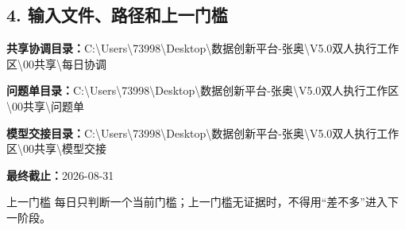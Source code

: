 \documentclass[UTF8,openany,zihao=-4]{ctexbook}
\renewcommand{\_}{\textunderscore\allowbreak}
\begin{document}
\subsection*{4. 输入文件、路径和上一门槛}
\noindent\textbf{共享协调目录：}{\promptlatin\promptcjk\small C:\textbackslash{}\allowbreak{}Users\textbackslash{}\allowbreak{}73998\textbackslash{}\allowbreak{}Desktop\textbackslash{}\allowbreak{}数据创新平台-\allowbreak{}张奥\textbackslash{}\allowbreak{}V5.0\_\allowbreak{}双人执行工作区\textbackslash{}\allowbreak{}00\_\allowbreak{}共享\textbackslash{}\allowbreak{}每日协调}\par
\noindent\textbf{问题单目录：}{\promptlatin\promptcjk\small C:\textbackslash{}\allowbreak{}Users\textbackslash{}\allowbreak{}73998\textbackslash{}\allowbreak{}Desktop\textbackslash{}\allowbreak{}数据创新平台-\allowbreak{}张奥\textbackslash{}\allowbreak{}V5.0\_\allowbreak{}双人执行工作区\textbackslash{}\allowbreak{}00\_\allowbreak{}共享\textbackslash{}\allowbreak{}问题单}\par
\noindent\textbf{模型交接目录：}{\promptlatin\promptcjk\small C:\textbackslash{}\allowbreak{}Users\textbackslash{}\allowbreak{}73998\textbackslash{}\allowbreak{}Desktop\textbackslash{}\allowbreak{}数据创新平台-\allowbreak{}张奥\textbackslash{}\allowbreak{}V5.0\_\allowbreak{}双人执行工作区\textbackslash{}\allowbreak{}00\_\allowbreak{}共享\textbackslash{}\allowbreak{}模型交接}\par
\noindent\textbf{最终截止：}{\promptlatin\promptcjk\small 2026-\allowbreak{}08-\allowbreak{}31}\par
\begin{gatebox}{上一门槛}
每日只判断一个当前门槛；上一门槛无证据时，不得用“差不多”进入下一阶段。

\end{gatebox}
\end{document}
